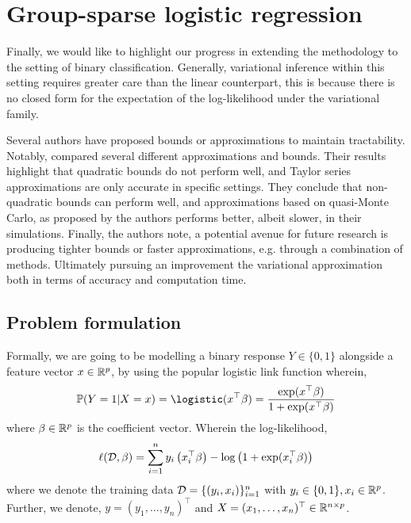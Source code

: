 \newpage
\section{Group-sparse logistic regression}

Finally, we would like to highlight our progress in extending the methodology to the setting of binary classification. Generally, variational inference within this setting requires greater care than the linear counterpart, this is because there is no closed form for the expectation of the log-likelihood under the variational family. 

Several authors have proposed bounds or approximations to maintain tractability. Notably, \cite{Depraetere2017a} compared several different approximations and bounds. Their results highlight that quadratic bounds do not perform well, and  Taylor series approximations are only accurate in specific settings. They conclude that non-quadratic bounds can perform well, and approximations based on quasi-Monte Carlo, as proposed by the authors performs better, albeit slower, in their simulations. Finally, the authors note, a potential avenue for future research is producing tighter bounds or faster approximations, e.g. through a combination of methods. Ultimately pursuing an improvement the variational approximation both in terms of accuracy and computation time. 

\subsection{Problem formulation}

Formally, we are going to be modelling a binary response $Y \in \{0, 1 \}$ alongside a feature vector $x \in \mathbb{R}^p$, by using the popular logistic link function wherein,
\begin{equation}
    \P(Y = 1 | X = x) = \logistic(x^\top \beta) =  \frac{\exp(x^\top \beta)}{1 + \exp(x^\top \beta)}
\end{equation}
where $\beta \in \mathbb{R}^p$ is the coefficient vector. Wherein the log-likelihood,
\begin{equation}
    \ell(\mathcal{D}, \beta) 
    = 
	\sum_{i=1}^n  y_i \left( x_i^\top \beta \right) 
	- \log \left(1 + \exp(x_i^\top \beta) \right)
\end{equation}
where we denote the training data $\mathcal{D} = \{(y_i, x_i)\}_{i=1}^n$ with $y_i \in \{0, 1\}, x_i \in \mathbb{R}^p$. Further, we denote, $y=(y_1, \dots, y_n)^\top$ and $X=(x_1, \dots, x_n)^\top \in \mathbb{R}^{n \times p}$. 


